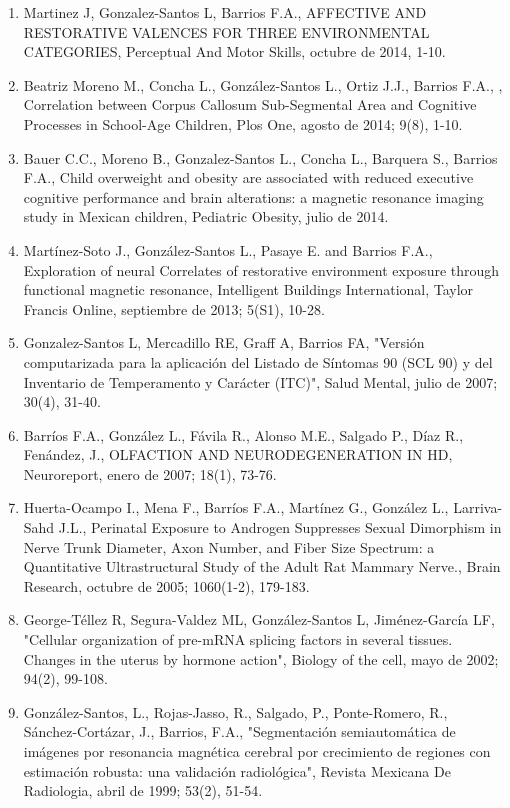 \begin{enumerate}
\item Martinez J, Gonzalez-Santos L, Barrios F.A., AFFECTIVE AND RESTORATIVE VALENCES FOR THREE ENVIRONMENTAL CATEGORIES, 
Perceptual And Motor Skills, octubre de 2014, 1-10.

\item Beatriz Moreno M., Concha L., González-Santos L., Ortiz J.J., Barrios F.A., , Correlation between Corpus Callosum 
Sub-Segmental Area and Cognitive Processes in School-Age Children, Plos One, agosto de 2014; 9(8), 1-10.

\item Bauer C.C., Moreno B., Gonzalez-Santos L., Concha L., Barquera S., Barrios F.A., Child overweight and obesity are 
associated with reduced executive cognitive performance and brain alterations: a magnetic resonance imaging study in Mexican 
children, Pediatric Obesity, julio de 2014.

\item Martínez-Soto J., González-Santos L., Pasaye E. and Barrios F.A., Exploration of neural Correlates of restorative 
environment exposure through functional magnetic resonance, Intelligent Buildings International, Taylor Francis Online, 
septiembre de 2013; 5(S1), 10-28.

\item Gonzalez-Santos L, Mercadillo RE, Graff A, Barrios FA, "Versión computarizada para la aplicación del Listado de 
Síntomas 
90 (SCL 90) y del Inventario de Temperamento y Carácter (ITC)", Salud Mental, julio de 2007; 30(4), 31-40.

\item Barríos F.A., González L., Fávila R., Alonso M.E., Salgado P., Díaz R., Fenández, J., OLFACTION AND NEURODEGENERATION 
IN 
HD, Neuroreport, enero de 2007; 18(1), 73-76.

\item Huerta-Ocampo I., Mena F., Barríos F.A., Martínez G., González L., Larriva-Sahd J.L., Perinatal Exposure to Androgen 
Suppresses Sexual Dimorphism in Nerve Trunk Diameter, Axon Number, and Fiber Size Spectrum: a Quantitative Ultrastructural 
Study of the Adult Rat Mammary Nerve., Brain Research, octubre de 2005; 1060(1-2), 179-183.

\item George-Téllez R, Segura-Valdez ML, González-Santos L, Jiménez-García LF, "Cellular organization of pre-mRNA splicing 
factors in several tissues. Changes in the uterus by hormone action", Biology of the cell, mayo de 2002; 94(2), 99-108.

\item González-Santos, L., Rojas-Jasso, R., Salgado, P., Ponte-Romero, R., Sánchez-Cortázar, J., Barrios, F.A., "Segmentación 
semiautomática de imágenes por resonancia magnética cerebral por crecimiento de regiones con estimación robusta: una 
validación radiológica", Revista Mexicana De Radiologia, abril de 1999; 53(2), 51-54.

\end{enumerate}
